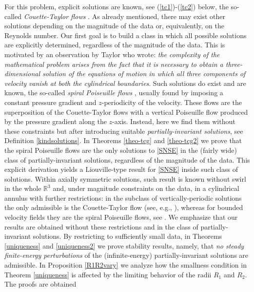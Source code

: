 \documentclass[a4paper,11pt]{amsart}
\numberwithin{equation}{section}
\numberwithin{figure}{section}
\def\eq#1{(\ref{#1})}
\begin{document}
For this problem, explicit solutions are known, see \eq{tc1}-\eq{tc2} below, the 
so-called \textit{Couette-Taylor flows} \cite[Chapter II]{landau}. As already mentioned, there may exist other 
solutions depending on the magnitude of the data or, equivalently, on the Reynolds number.
Our first goal is to build a class in which all possible solutions are explicitly determined, regardless of the magnitude of the data.   
This is motivated by an observation by Taylor \cite[p.293]{taylor} who
	wrote: {\it the complexity of the mathematical problem 
    arises from the fact that it is necessary to obtain a 
    three-dimensional solution of
	the equations of motion in which all three 
    components of velocity vanish at both the 
    cylindrical boundaries}. Such solutions do exist and
    are known, the so-called {\em spiral Poiseuille flows} \cite{Joseph,Titi}, usually found by 
    imposing a constant pressure gradient and $z$-periodicity of the velocity.
    These flows are the superposition of the Couette-Taylor flows with
    a vertical Poiseuille flow produced by the pressure gradient along the 
    $z$-axis. Instead, here we find them without these constraints but after introducing suitable {\em partially-invariant solutions}, see Definition
        \ref{kindsolutions}. In Theorems \ref{theo-tcg} 
and \ref{theo-tcg2} we prove that the spiral Poiseuille flows are the only solutions to \eqref{SNSE} in the (fairly 
wide) class of partially-invariant solutions, regardless
of the magnitude of the data. This explicit derivation yields a Liouville-type result for \eqref{SNSE} inside such class of solutions. Within axially symmetric solutions, such result is known without swirl \cite{KochSereginSverak, korobkovpileckas, korobkov-addendum} in the whole $\mathbb{R}^3$ and, under magnitude constraints on the data, in a cylindrical annulus with further restrictions: in the subclass of
vertically-periodic solutions the only admissible is the Couette-Taylor flow (see, e.g.,
\cite[Proposition II.4.2]{temam2001navier}), whereas 
for bounded velocity fields they are the spiral Poiseuille flows, see \cite{kozono2023liouville}. We emphasize that our results 
are obtained without these restrictions and in the class of partially-invariant solutions. By restricting to sufficiently small data,
in Theorems \ref{uniqueness} and \ref{uniqueness2} we prove 
stability results, namely, that {\em no steady finite-energy 
perturbations} of the (infinite-energy) 
partially-invariant solutions are admissible. In Proposition \ref{R1R2vary} we analyze how the smallness condition in Theorem \ref{uniqueness} is affected by the limiting behavior of the radii $R_1$ and $R_2$. The proofs are obtained
\end{document}
